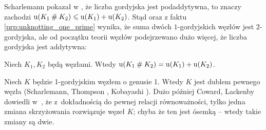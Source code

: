 Scharlemann pokazał w \cite[wniosek 1.6]{scharlemann1998}, że liczba gordyjska jest podaddytywna, to znaczy zachodzi $\operatorname{u}(K_1 \mathbin{\#} K_2) \leqslant \operatorname{u}(K_1) + \operatorname{u}(K_2)$.
Stąd oraz z faktu \ref{prp:unknotting_one_prime} wynika, że suma dwóch $1$-gordyjskich węzłów jest $2$-gordyjska, ale od początku teorii węzłów podejrzewano dużo więcej, że liczba gordyjska jest addytywna:

\begin{conjecture}
%
\label{conjecture_unknotting_additive}%
    Niech $K_1, K_2$ będą węzłami.
    Wtedy $\operatorname{u} (K_1 \mathbin{\#} K_2) = \operatorname{u}(K_1) + \operatorname{u}(K_2)$.
\end{conjecture}

Niech $K$ będzie 1-gordyjskim węzłem o genusie 1.
Wtedy $K$ jest dublem pewnego węzła (Scharlemann, Thompson \cite{thompson1988}, Kobayashi \cite{kobayashitsuyoshi1989}).
%
%
%
Dużo później Coward, Lackenby dowiedli w~\cite{coward2011}, że z~dokładnością do pewnej relacji równoważności, tylko jedna zmiana skrzyżowania rozwiązuje węzeł $K$; chyba że ten jest ósemką -- wtedy takie zmiany są dwie.
%
%


